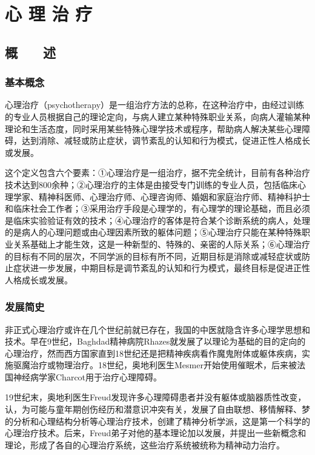 \chapter{心 理 治 疗}

\section{概　　述}

\subsection{基本概念}

心理治疗（psychotherapy）是一组治疗方法的总称，在这种治疗中，由经过训练的专业人员根据自己的理论定向，与病人建立某种特殊职业关系，向病人灌输某种理论和生活态度，同时采用某些特殊心理学技术或程序，帮助病人解决某些心理障碍，达到消除、减轻或防止症状，调节紊乱的认知和行为模式，促进正性人格成长或发展。

这个定义包含六个要素：①心理治疗是一组治疗，据不完全统计，目前有各种治疗技术达到800余种；②心理治疗的主体是由接受专门训练的专业人员，包括临床心理学家、精神科医师、心理治疗师、心理咨询师、婚姻和家庭治疗师、精神科护士和临床社会工作者；③采用治疗手段是心理学的，有心理学的理论基础，而且必须是临床实验验证有效的技术；④心理治疗的客体是符合某个诊断系统的病人，处理的是病人的心理问题或由心理因素所致的躯体问题；⑤心理治疗只能在某种特殊职业关系基础上才能生效，这是一种新型的、特殊的、亲密的人际关系；⑥心理治疗的目标有不同的层次，不同学派的目标有所不同，近期目标是消除或减轻症状或防止症状进一步发展，中期目标是调节紊乱的认知和行为模式，最终目标是促进正性人格成长或发展。

\subsection{发展简史}

非正式心理治疗或许在几个世纪前就已存在，我国的中医就隐含许多心理学思想和技术。早在9世纪，Baghdad精神病院Rhazes就发展了以理论为基础的目的定向的心理治疗，然而西方国家直到18世纪还是把精神疾病看作魔鬼附体或躯体疾病，实施驱魔治疗或物理治疗。18世纪，奥地利医生Mesmer开始使用催眠术，后来被法国神经病学家Charcot用于治疗心理障碍。

19世纪末，奥地利医生Freud发现许多心理障碍患者并没有躯体或脑器质性改变，认，为可能与童年期创伤经历和潜意识冲突有关，发展了自由联想、移情解释、梦的分析和心理结构分析等心理治疗技术，创建了精神分析学派，这是第一个科学的心理治疗技术。后来，Freud弟子对他的基本理论加以发展，并提出一些新概念和理论，形成了各自的心理治疗系统，这些治疗系统被统称为精神动力治疗。

